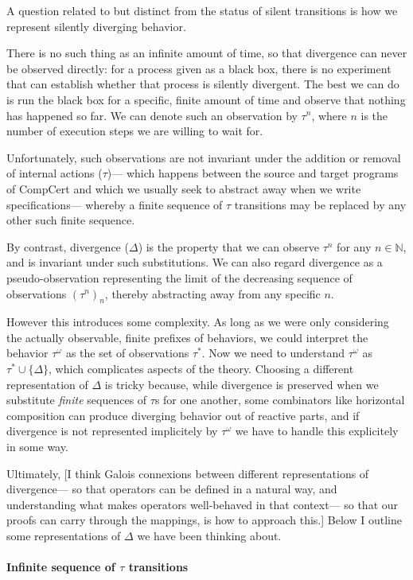 \documentclass[11pt]{article}
\begin{document}
A question related to but distinct from
the status of silent transitions is
how we represent silently diverging behavior.

There is no such thing as an infinite amount of time,
so that divergence can never be observed directly:
for a process given as a black box,
there is no experiment that can establish
whether that process is silently divergent.
The best we can do is run the black box for a specific, finite amount of time
and observe that nothing has happened so far.
We can denote such an observation by $\tau^n$,
where $n$ is the number of execution steps we are willing to wait for.

Unfortunately,
such observations are not invariant under
the addition or removal of internal actions ($\tau$)---%
which happens between the source and target programs
of CompCert and
which we usually seek to abstract away
when we write specifications---%
whereby a finite sequence of $\tau$ transitions
may be replaced by any other such finite sequence.

By contrast,
divergence ($\Delta$) is the property that we can observe $\tau^n$
for any $n \in \mathbb{N}$,
and is invariant under such substitutions.
We can also regard divergence as a pseudo-observation
representing the limit of
the decreasing sequence of observations $(\tau^n)_n$,
thereby abstracting away from any specific $n$.

However this introduces some complexity.
As long as we were only considering the actually observable,
finite prefixes of behaviors,
we could interpret the behavior $\tau^\omega$
as the set of observations $\tau^*$.
Now we need to understand $\tau^\omega$ as $\tau^* \cup \{\Delta\}$,
which complicates aspects of the theory.
Choosing a different representation of $\Delta$ is tricky because,
while divergence is preserved
when we substitute \emph{finite} sequences of $\tau$s for one another,
some combinators like horizontal composition
can produce diverging behavior out of reactive parts,
and if divergence is not represented implicitely by $\tau^\omega$
we have to handle this explicitely in some way.

Ultimately, [I think Galois connexions
between different representations of divergence---%
so that operators can be defined in a natural way,
and understanding what makes operators well-behaved in that context---%
so that our proofs can carry through the mappings,
is how to approach this.]
Below I outline some representations of $\Delta$
we have been thinking about.

\paragraph{Infinite sequence of $\tau$ transitions}
\end{document}

